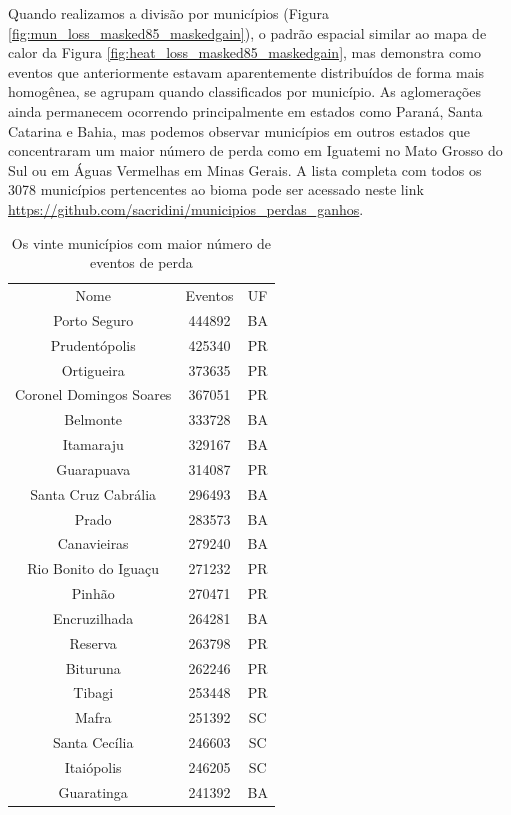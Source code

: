 Quando realizamos a divisão por municípios (Figura \ref{fig:mun_loss_masked85_maskedgain}), o padrão espacial similar ao mapa de calor da Figura \ref{fig:heat_loss_masked85_maskedgain}, mas demonstra como eventos que anteriormente estavam aparentemente distribuídos de forma mais homogênea, se agrupam quando classificados por município. As aglomerações ainda permanecem ocorrendo principalmente em estados como Paraná, Santa Catarina e Bahia, mas podemos observar municípios em outros estados que concentraram um maior número de perda como em Iguatemi no Mato Grosso do Sul ou em Águas Vermelhas em Minas Gerais. A lista completa com todos os 3078 municípios pertencentes ao bioma pode ser acessado neste link \url{https://github.com/sacridini/municipios_perdas_ganhos}.

\begin{table}[h!]
    \centering
    \begin{tabular}{|c | c | c|}
    \hline
                    Nome & Eventos & UF \\
            Porto Seguro & 444892 & BA \\
           Prudentópolis & 425340 & PR \\
              Ortigueira & 373635 & PR \\
 Coronel Domingos Soares & 367051 & PR \\
                Belmonte & 333728 & BA \\
               Itamaraju & 329167 & BA \\
              Guarapuava & 314087 & PR \\
     Santa Cruz Cabrália & 296493 & BA \\
                   Prado & 283573 & BA \\
             Canavieiras & 279240 & BA \\
    Rio Bonito do Iguaçu & 271232 & PR \\
                  Pinhão & 270471 & PR \\
            Encruzilhada & 264281 & BA \\
                 Reserva & 263798 & PR \\
                Bituruna & 262246 & PR \\
                  Tibagi & 253448 & PR \\
                   Mafra & 251392 & SC \\
           Santa Cecília & 246603 & SC \\
              Itaiópolis & 246205 & SC \\
              Guaratinga & 241392 & BA \\
    \hline
    \end{tabular}
    \caption{Os vinte municípios com maior número de eventos de perda}
    \label{tab:mun_loss}
\end{table}


